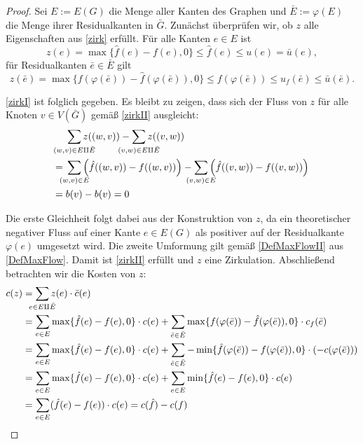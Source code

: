 \begin{proof}Sei $E:=E(G)$ die Menge aller Kanten des Graphen und $\bar{E}:=\varphi(E)$ die Menge ihrer Residualkanten in $\bar{G}$. Zunächst überprüfen wir, ob $z$ alle Eigenschaften aus \cref{zirk} erfüllt. Für alle Kanten $e\in E$ ist
\begin{equation*}z(e)=\max\{\hat{f}(e)-f(e),0\}\leq\hat{f}(e)\leq u(e)=\bar{u}(e),\end{equation*}
für Residualkanten $\bar{e}\in \bar{E}$ gilt
\begin{equation*}z(\bar{e})=\max\{f(\varphi(\bar{e}))-\hat{f}(\varphi(\bar{e})),0\}\leq f(\varphi(\bar{e}))\leq u_f(\bar{e})\leq \bar{u}(\bar{e}).\end{equation*}

\cref{zirkI} ist folglich gegeben. Es bleibt zu zeigen, dass sich der Fluss von $z$ für alle Knoten $v\in V(\bar{G})$ gemäß \cref{zirkII} ausgleicht:
\begin{align*}&\sum_{\mathclap{(w,v)\in E\amalg\bar{E}}} z((w,v)) - \sum_{\mathclap{(v,w)\in E\amalg\bar{E}}} z((v,w))\\
={}&\sum_{\mathclap{(w,v)\in E}} \Big(\hat{f}((w,v)) -  f((w,v))\Big) -  \sum_{\mathclap{(v,w)\in E}} \Big(\hat{f}((v,w)) - f((v,w))\Big)\\
={}&b(v)-b(v)=0\end{align*}

Die erste Gleichheit folgt dabei aus der Konstruktion von $z$, da ein theoretischer negativer Fluss auf einer Kante $e\in E(G)$ als positiver auf der Residualkante $\varphi(e)$ umgesetzt wird. Die zweite Umformung gilt gemäß \cref{DefMaxFlowII} aus \cref{DefMaxFlow}. Damit ist \cref{zirkII} erfüllt und $z$ eine Zirkulation. Abschließend betrachten wir die Kosten von $z$:
\begin{align*}c(z)&=\sum_{\mathclap{e\in E\amalg\bar{E}}} z(e)\cdot \bar{c}(e)\\
&=\sum_{e\in E}\max\{\hat{f}(e)-f(e),0\}\cdot c(e) + \sum_{\bar{e}\in \bar{E}}\max\{f(\varphi(\bar{e}))-\hat{f}(\varphi(\bar{e})),0\}\cdot c_f(\bar{e})\\
&=\sum_{e\in E}\max\{\hat{f}(e)-f(e),0\}\cdot c(e) + \sum_{\bar{e}\in \bar{E}}-\min\{\hat{f}(\varphi(\bar{e}))-f(\varphi(\bar{e})),0\}\cdot(- c(\varphi(\bar{e})))\\
&=\sum_{e\in E}\max\{\hat{f}(e)-f(e),0\}\cdot c(e) + \sum_{e\in E}\min\{\hat{f}(e)-f(e),0\}\cdot c(e)\\
&=\sum_{e\in E} (\hat{f}(e)-f(e))\cdot c(e) = c(\hat{f})-c(f)\qedhere
\end{align*}\end{proof}

